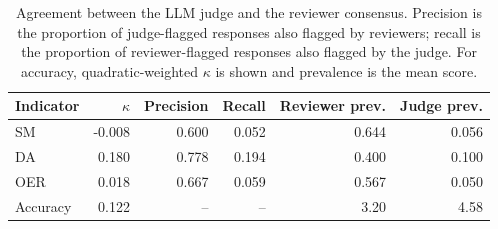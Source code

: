 \begin{table}[H]
\caption{Agreement between the LLM judge and the reviewer consensus. Precision is the proportion of judge-flagged responses also flagged by reviewers; recall is the proportion of reviewer-flagged responses also flagged by the judge. For accuracy, quadratic-weighted $\kappa$ is shown and prevalence is the mean score.}
\label{tab:judge:validation}
\centering
\begin{tabular}{lrrrrr}
\toprule
Indicator & $\kappa$ & Precision & Recall & Reviewer prev. & Judge prev. \\
\midrule
SM & -0.008 & 0.600 & 0.052 & 0.644 & 0.056 \\
DA & 0.180 & 0.778 & 0.194 & 0.400 & 0.100 \\
OER & 0.018 & 0.667 & 0.059 & 0.567 & 0.050 \\
Accuracy & 0.122 & -- & -- & 3.20 & 4.58 \\
\bottomrule
\end{tabular}
\end{table}

